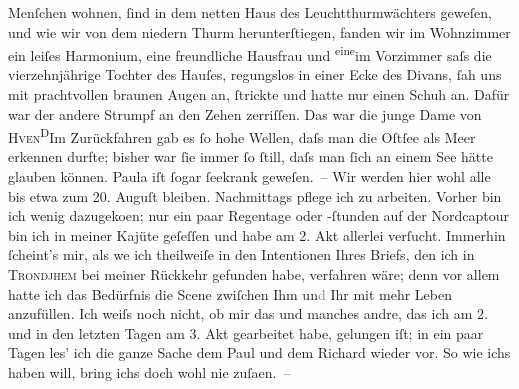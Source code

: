                Menſchen wohnen, ſind in dem netten Haus des Leuchtthurmwächters geweſen, und wie wir von dem niedern
               Thurm herunterſtiegen, fanden wir im Wohnzimmer ein leiſes Harmonium, eine
               freundliche Hausfrau und \substVorne{}\textsuperscript{eine}\substDazwischen{}im\substHinten{} Vorzimmer saſs die vierzehnjährige Tochter des Hauſes, regungslos in einer Ecke des Divans,
               ſah uns mit prachtvollen braunen Augen an, {\pb}ſtrickte und
               hatte nur einen Schuh an. Dafür war der andere Strumpf an den Zehen zerriſſen. Das
               war die junge Dame von \textsc{Hven}\substVorne{}\textsuperscript{D}\substDazwischen{}I\substHinten{}m Zurückfahren gab es ſo hohe Wellen, daſs man die Oſtſee als Meer erkennen durfte; bisher war ſie immer ſo
               ſtill, daſs man ſich an einem See hätte glauben können. Paula iſt ſogar ſeekrank geweſen. – Wir werden hier wohl alle
               bis etwa zum 20. Auguſt bleiben. Nachmittags pflege ich zu
               arbeiten. Vorher bin ich {\pb}wenig dazugeko{\geminationm}en; nur ein paar Regentage oder -ſtunden auf der Nordcaptour bin ich in meiner Kajüte geſeſſen
               und habe am 2. Akt allerlei
               verſucht. Immerhin ſcheint’s mir, als we{\geminationn} ich theilweiſe
               in den Intentionen Ihres Briefs, den ich in \textsc{Trondjhem} bei meiner Rückkehr gefunden habe, verfahren wäre; denn vor allem hatte ich das
               Bedürfnis die Scene zwiſchen Ihm un\textcolor{gray}{d} Ihr mit mehr Leben
               anzufüllen. Ich weiſs noch nicht, ob mir das {\pb}und manches
               andre, das ich am 2. und in
               den letzten Tagen am 3. Akt
               gearbeitet habe, gelungen iſt; in ein paar Tagen les’ ich die ganze Sache dem Paul und dem Richard wieder vor. So wie ichs haben will, bring ichs doch wohl nie zuſa{\geminationm}en. –\pend
           
